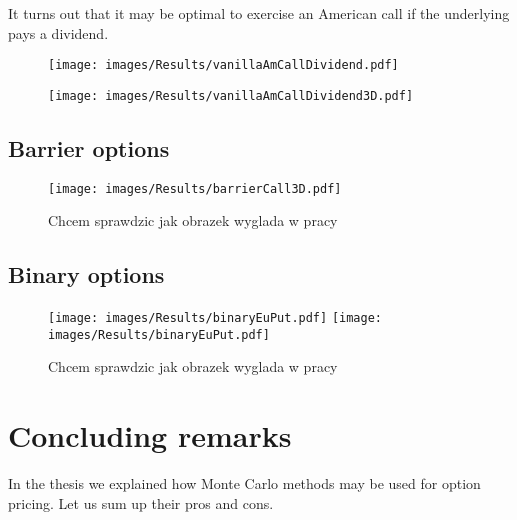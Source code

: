 \documentclass[a4paper,11pt, twoside]{book}
\theoremstyle{definition}
\theoremstyle{remark}
\begin{document}
It turns out that it may be optimal to exercise an American call if the underlying pays a dividend. 

\begin{figure}
\centering
 \texttt{[image: images/Results/vanillaAmCallDividend.pdf]}
\caption{}
\label{fig:results:vanillaAmCallDividend}
\end{figure}

\begin{figure}
\centering
 \texttt{[image: images/Results/vanillaAmCallDividend3D.pdf]}
\caption{}
\label{fig:results:vanillaAmCallDividend3D}
\end{figure}

\section{Barrier options}
\begin{figure}
\centering
 \texttt{[image: images/Results/barrierCall3D.pdf]}
\caption{Chcem sprawdzic jak obrazek wyglada w pracy}
\label{fig:results:dupa2}
\end{figure}

\section{Binary options}
\begin{figure}
\centering
 \texttt{[image: images/Results/binaryEuPut.pdf]}
 \texttt{[image: images/Results/binaryEuPut.pdf]}
\caption{Chcem sprawdzic jak obrazek wyglada w pracy}
\label{fig:results:dupa3}
\end{figure}

\chapter*{Concluding remarks}
In the thesis we explained how Monte Carlo methods may be used for option pricing. Let us sum up their pros and cons.
\end{document}
